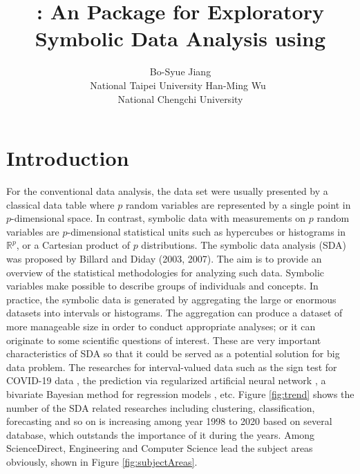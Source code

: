\documentclass[article]{jss}
\author{Bo-Syue Jiang\\National Taipei University
\And Han-Ming Wu~\orcidlink{0000-0001-9464-3127}\\National Chengchi University}
\title{\pkg{ggESDA}: An \proglang{R} Package for Exploratory \\ Symbolic Data Analysis using \pkg{ggplot2}}
\newcommand{\fct}[1]{\code{#1()}}
\begin{document}
\section[Introduction]{Introduction} \label{sec:intro}

For the conventional data analysis, the data set were usually
presented by a classical data table where $p$ random variables are
represented by a single point in $p$-dimensional space. In contrast,
symbolic data with measurements on $p$ random variables are
$p$-dimensional statistical units such as hypercubes or histograms in
$\mathbb{R}^p$, or a Cartesian product of $p$ distributions. The
symbolic data analysis (SDA) was proposed by Billard and Diday (2003,
2007). The aim is to provide an overview of the statistical
methodologies for analyzing such data. Symbolic variables make
possible to describe groups of individuals and concepts. In practice,
the symbolic data is generated by aggregating the large or enormous
datasets into intervals or histograms. The aggregation can produce a
dataset of more manageable size in order to conduct appropriate
analyses; or it can originate to some scientific questions of
interest. These are very important characteristics of SDA so that it
could be served as a potential solution for big data problem. The
researches for interval-valued data such as the sign test for COVID-19
data \cite{sherwani:2021}, the prediction via regularized artificial
neural network \cite{yang:2019}, a bivariate Bayesian method for
regression models \cite{xu:2021}, etc. Figure \ref{fig:trend} shows
the number of the SDA related researches including clustering,
classification, forecasting and so on is increasing among year 1998 to
2020 based on several database, which outstands the importance of it
during the years. Among ScienceDirect, Engineering and Computer
Science lead the subject areas obviously, shown in Figure
\ref{fig:subjectAreas}.
\end{document}
